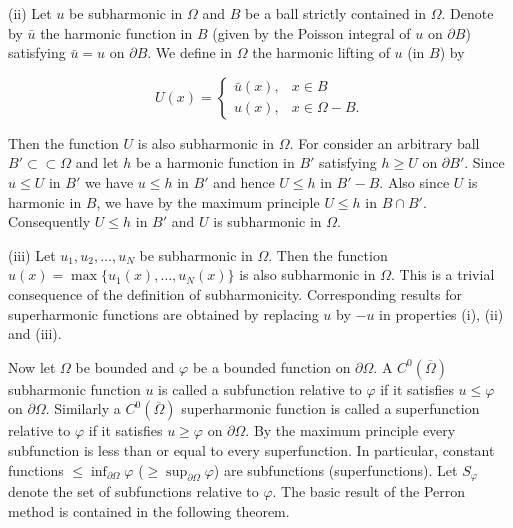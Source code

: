 \noindent (ii) Let $u$ be subharmonic in $\Omega$ and $B$ be a ball strictly contained in $\Omega$. Denote by $\bar u$ the harmonic function in $B$ (given by the Poisson integral of $u$ on $\partial B$) satisfying $\bar u=u$ on $\partial B$. We define in $\Omega$ the harmonic lifting of $u$ (in $B$) by

\[
U(x)=\begin{cases}
\bar u(x), & x\in B \\
 u(x), & x\in \Omega-B.
\end{cases}
\tag{2.33}
\]

Then the function $U$ is also subharmonic in $\Omega$. For consider an arbitrary ball $B'\subset\subset\Omega$ and let $h$ be a harmonic function in $B'$ satisfying $h\geq U$ on $\partial B'$. Since $u\leq U$ in $B'$ we have $u\leq h$ in $B'$ and hence $U\leq h$ in $B'-B$. Also since $U$ is harmonic in $B$, we have by the maximum principle $U\leq h$ in $B\cap B'$. Consequently $U\leq h$ in $B'$ and $U$ is subharmonic in $\Omega$.

\noindent (iii) Let $u_1, u_2, \dots, u_N$ be subharmonic in $\Omega$. Then the function $u(x)=\max\{u_1(x),\dots,u_N(x)\}$ is also subharmonic in $\Omega$. This is a trivial consequence of the definition of subharmonicity. Corresponding results for superharmonic functions are obtained by replacing $u$ by $-u$ in properties (i), (ii) and (iii).

Now let $\Omega$ be bounded and $\varphi$ be a bounded function on $\partial\Omega$. A $C^0(\overline\Omega)$ subharmonic function $u$ is called a subfunction relative to $\varphi$ if it satisfies $u\leq \varphi$ on $\partial\Omega$. Similarly a $C^0(\overline\Omega)$ superharmonic function is called a superfunction relative to $\varphi$ if it satisfies $u\geq \varphi$ on $\partial\Omega$. By the maximum principle every subfunction is less than or equal to every superfunction. In particular, constant functions $\leq \inf_{\partial\Omega}\varphi$ ($\geq \sup_{\partial\Omega}\varphi$) are subfunctions (superfunctions). Let $S_\varphi$ denote the set of subfunctions relative to $\varphi$. The basic result of the Perron method is contained in the following theorem.

